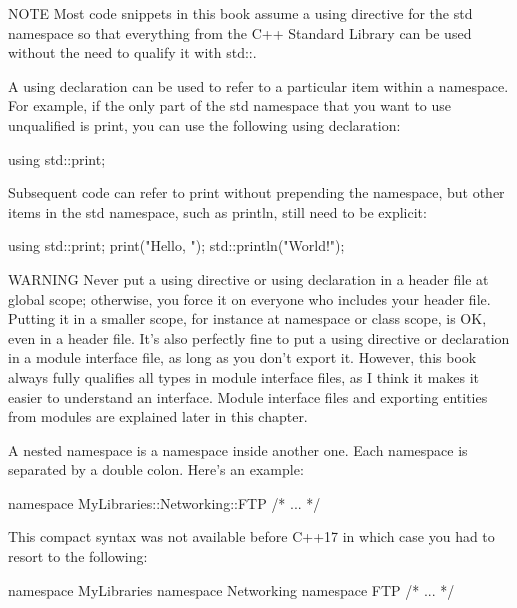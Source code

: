 \begin{myNotic}{NOTE}
Most code snippets in this book assume a using directive for the std namespace so that everything from the C++ Standard Library can be used without the need to qualify it with std::.
\end{myNotic}

A using declaration can be used to refer to a particular item within a namespace. For example, if the only part of the std namespace that you want to use unqualified is print, you can use the following using declaration:

\begin{cpp}
using std::print;
\end{cpp}

Subsequent code can refer to print without prepending the namespace, but other items in the std namespace, such as println, still need to be explicit:

\begin{cpp}
using std::print;
print("Hello, ");
std::println("World!");
\end{cpp}

\begin{myWarning}{WARNING}
Never put a using directive or using declaration in a header file at global scope; otherwise, you force it on everyone who includes your header file. Putting it in a smaller scope, for instance at namespace or class scope, is OK, even in a header file. It’s also perfectly fine to put a using directive or declaration in a module interface file, as long as you don’t export it. However, this book always fully qualifies all types in module interface files, as I think it makes it easier to understand an interface. Module interface files and exporting entities from modules are explained later in this chapter.
\end{myWarning}


A nested namespace is a namespace inside another one. Each namespace is separated by a double colon. Here’s an example:

\begin{cpp}
namespace MyLibraries::Networking::FTP {
    /* ... */
}
\end{cpp}

This compact syntax was not available before C++17 in which case you had to resort to the following:

\begin{cpp}
namespace MyLibraries {
    namespace Networking {
        namespace FTP {
            /* ... */
        }
    }
}
\end{cpp}

